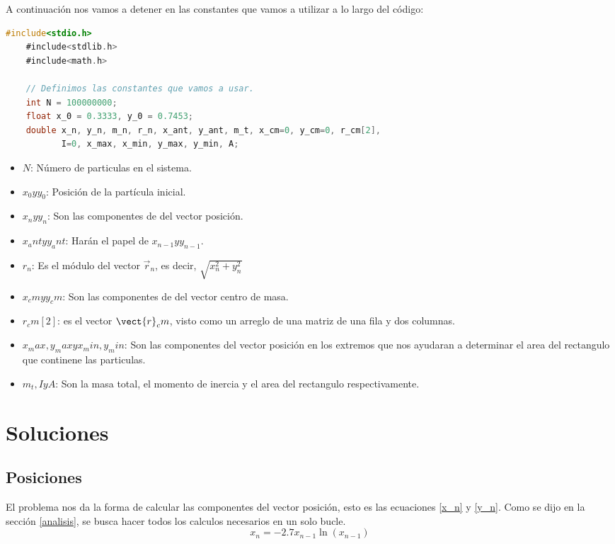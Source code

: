 \documentclass[12pt]{article}
\begin{document}
A continuación nos vamos a detener en las constantes que vamos a utilizar a lo largo del código:

\begin{lstlisting}[language=C, caption={Declaraciòn de Variables}, style=mystyle]
    #include<stdio.h>
    #include<stdlib.h>
    #include<math.h>
    
    // Definimos las constantes que vamos a usar.
    int N = 100000000;
    float x_0 = 0.3333, y_0 = 0.7453;
    double x_n, y_n, m_n, r_n, x_ant, y_ant, m_t, x_cm=0, y_cm=0, r_cm[2],
           I=0, x_max, x_min, y_max, y_min, A;
    \end{lstlisting}

\begin{itemize}
    \item $N$: Número de particulas en el sistema.
    \item $x_0 y y_0$: Posición de la partícula inicial. 
    \item $x_n y y_n$: Son las componentes de del vector posición.
    \item $x_ant y y_ant$: Harán el papel de $x_{n-1} y y_{n-1}$.
    \item $r_n$: Es el módulo del vector $\vec{r}_n$, es decir, $\sqrt{ x^2_n + y^2_n}$
    \item $x_cm y y_cm$: Son las componentes de del vector centro de masa.
    \item $r_cm[2]$: es el vector $\vect{r}_cm$, visto como un arreglo de una matriz de una fila y dos columnas.
    \item $x_max, y_max y x_min, y_min $: Son las componentes del vector posición en los extremos que nos ayudaran a determinar el area del rectangulo que continene las particulas.
    \item $m_t, I y A$: Son la masa total, el momento de inercia y el area del rectangulo respectivamente.
\end{itemize}


\section{Soluciones}

\subsection{Posiciones}

El problema nos da la forma de calcular las componentes del vector posición, esto es las ecuaciones \ref{x_n} y \ref{y_n}. Como se dijo en la sección \ref{analisis}, se busca hacer todos
los calculos necesarios en un solo bucle. 
\begin{equation}
    \label{x_n}
    x_n = -2.7 x_{n-1} \ln(x_{n-1})
\end{equation}
\end{document}
